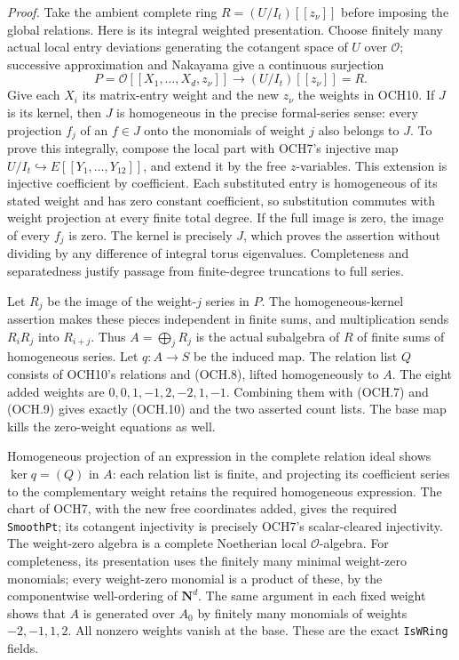 \emph{Proof.}
Take the ambient complete ring
\(R=(U/I_t)[[z_\nu]]\) before imposing the global relations.
Here is its integral weighted presentation.  Choose finitely many
actual local entry deviations generating the cotangent space of
\(U\) over \(\mathcal O\); successive approximation and
Nakayama give a continuous surjection
\[
 P=\mathcal O[[X_1,\ldots,X_d,z_\nu]]
       \longrightarrow (U/I_t)[[z_\nu]]=R.
\]
Give each \(X_i\) its matrix-entry weight and the new
\(z_\nu\) the weights in OCH10.  If \(J\) is its kernel,
then \(J\) is homogeneous in the precise formal-series sense:
every projection \(f_j\) of an \(f\in J\) onto the
monomials of weight \(j\) also belongs to \(J\).
To prove this integrally, compose the local part with OCH7's
injective map \(U/I_t\hookrightarrow E[[Y_1,\ldots,Y_{12}]]\),
and extend it by the free \(z\)-variables.  This extension is
injective coefficient by coefficient.  Each substituted entry is
homogeneous of its stated weight and has zero constant coefficient,
so substitution commutes with weight projection at every finite
total degree.  If the full image is zero, the image of every
\(f_j\) is zero.  The kernel is precisely \(J\), which
proves the assertion without dividing by any difference of integral
torus eigenvalues.  Completeness and separatedness justify passage
from finite-degree truncations to full series.

Let \(R_j\) be the image of the weight-\(j\) series in
\(P\).  The homogeneous-kernel assertion makes these pieces
independent in finite sums, and multiplication sends
\(R_iR_j\) into \(R_{i+j}\).  Thus
\(A=\bigoplus_j R_j\) is the actual subalgebra of \(R\)
of finite sums of homogeneous series.  Let
\(q:A\to S\) be the induced map.  The relation list \(Q\)
consists of OCH10's relations and (OCH.8), lifted homogeneously to
\(A\).  The eight added weights are
\(0,0,1,-1,2,-2,1,-1\).  Combining them with (OCH.7) and
(OCH.9) gives exactly (OCH.10) and the two asserted count lists.
The base map kills the zero-weight equations as well.

Homogeneous projection of an expression in the complete relation
ideal shows
\(\ker q=(Q)\) in \(A\): each relation list is finite,
and projecting its coefficient series to the complementary weight
retains the required homogeneous expression.  The chart of OCH7,
with the new free coordinates added, gives the required
\texttt{SmoothPt}; its cotangent injectivity is precisely OCH7's
scalar-cleared injectivity.  The weight-zero algebra is a complete
Noetherian local \(\mathcal O\)-algebra.  For completeness,
its presentation uses the finitely many minimal weight-zero
monomials; every weight-zero monomial is a product of these,
by the componentwise well-ordering of \(\mathbf N^d\).
The same argument in each fixed weight shows that \(A\) is
generated over \(A_0\) by finitely many monomials of weights
\(-2,-1,1,2\).  All nonzero weights vanish at the base.
These are the exact \texttt{IsWRing} fields.

